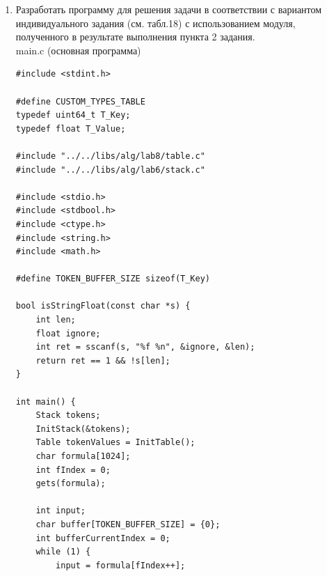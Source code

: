 \documentclass[a4paper,14pt]{extarticle}
\begin{document}
\begin{enumerate}
\begin{verbatim}
    return false;
}

bool ReadTable(Table *T, BaseType *E, T_Key Key) {
    TableError = TableOk;
    BeginPtr(T);
    while (!EndList(T) && T->ptr->next->data.Key < Key)
        MovePtr(T);
    
    if (EndList(T)) return false;

    if (T->ptr->next->data.Key == Key) {
        ReadList(T, E);

        return true;
    }

    return false;
}

bool WriteTable(Table *T, BaseType E) {
    TableError = TableOk;
    BeginPtr(T);
    while (!EndList(T) && T->ptr->next->data.Key < E.Key)
        MovePtr(T);
    
    if (EndList(T)) return false;

    if (T->ptr->next->data.Key == E.Key) {
        MovePtr(T);
        T->ptr->data = E;

        return true;
    }

    return false;
}

void DoneTable(Table *T) {
    TableError = TableOk;
    DoneList(T);
}
\end{verbatim}
\item Разработать программу для решения задачи в соответствии с вариантом
индивидуального задания (см. табл.18) с использованием модуля, полученного
в результате выполнения пункта 2 задания.\\
main.c (основная программа)
\begin{verbatim}
#include <stdint.h>

#define CUSTOM_TYPES_TABLE
typedef uint64_t T_Key;
typedef float T_Value;

#include "../../libs/alg/lab8/table.c"
#include "../../libs/alg/lab6/stack.c"

#include <stdio.h>
#include <stdbool.h>
#include <ctype.h>
#include <string.h>
#include <math.h>

#define TOKEN_BUFFER_SIZE sizeof(T_Key)

bool isStringFloat(const char *s) {
    int len;
    float ignore;
    int ret = sscanf(s, "%f %n", &ignore, &len);
    return ret == 1 && !s[len];
}

int main() {
    Stack tokens;
    InitStack(&tokens);
    Table tokenValues = InitTable();
    char formula[1024];
    int fIndex = 0;
    gets(formula);

    int input;
    char buffer[TOKEN_BUFFER_SIZE] = {0};
    int bufferCurrentIndex = 0;
    while (1) {
        input = formula[fIndex++];


\end{verbatim}
\end{enumerate}
\end{document}
